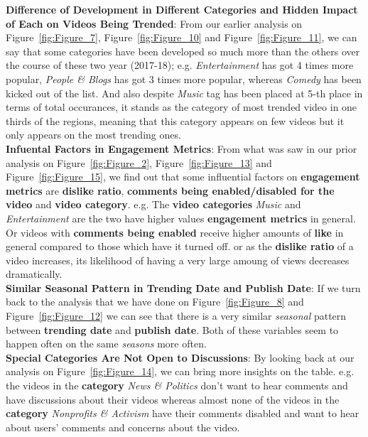 \documentclass[a4paper,12pt]{article}
\begin{document}
\noindent \textbf{Difference of Development in Different Categories and Hidden Impact of Each on Videos Being Trended}: From our earlier analysis on Figure~\ref{fig:Figure_7}, Figure~\ref{fig:Figure_10} and Figure~\ref{fig:Figure_11}, we can say 
that some categories have been developed so much more than the others over the course of these two year (2017-18); e.g. \textit{Entertainment} has got 4 times more popular, 
\textit{People \& Blogs} has got 3 times more popular, whereas \textit{Comedy} has been kicked out of the list. And also despite \textit{Music} tag has been placed at 5-th place in terms of total occurances, 
it stands as the category of most trended video in one thirds of the regions, meaning that this category appears on few videos but it only appears on the most trending ones. \\

\noindent \textbf{Infuental Factors in Engagement Metrics}: From what was saw in our prior analysis on Figure~\ref{fig:Figure_2}, Figure~\ref{fig:Figure_13} and Figure~\ref{fig:Figure_15}, we find out 
that some influential factors on \textbf{engagement metrics} are \textbf{dislike ratio}, \textbf{comments being enabled/disabled for the video} and \textbf{video category}. e.g. The \textbf{video categories} \textit{Music} and \textit{Entertainment} are the two 
have higher values \textbf{engagement metrics} in general. Or videos with \textbf{comments being enabled} receive higher amounts of \textbf{like} in general compared to those which have it turned off. 
or as the \textbf{dislike ratio} of a video increases, its likelihood of having a very large amoung of views decreases dramatically. \\ 

\noindent \textbf{Similar Seasonal Pattern in Trending Date and Publish Date}: If we turn back to the analysis that we have done on Figure~\ref{fig:Figure_8} and Figure~\ref{fig:Figure_12} we can 
see that there is a very similar \textit{seasonal} pattern between \textbf{trending date} and \textbf{publish date}. Both of these variables seem to happen often on the same \textit{seasons} more often. \\ 
 
\noindent \textbf{Special Categories Are Not Open to Discussions}: By looking back at our analysis on Figure~\ref{fig:Figure_14}, we can bring more insights on the table. e.g. 
the videos in the \textbf{category} \textit{News \& Politics} don't want to hear comments and have discussions about their videos whereas almost none of the videos in the \textbf{category} 
\textit{Nonprofits \& Activism} have their comments disabled and want to hear about users' comments and concerns about the video. \\ 
\end{document}
